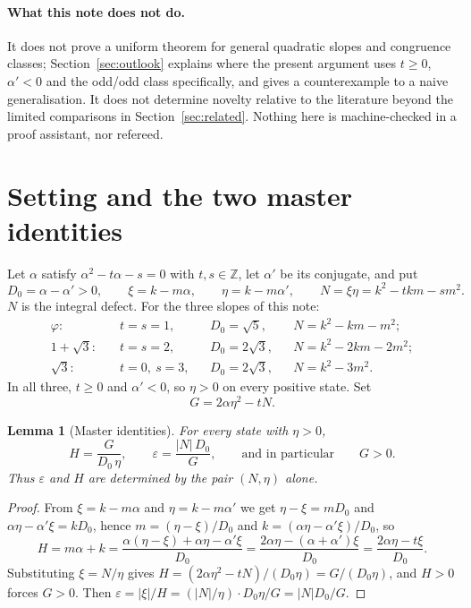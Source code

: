 \documentclass[11pt]{article}
\newtheorem{lemma}[theorem]{Lemma}
\theoremstyle{definition}
\theoremstyle{remark}
\newcommand{\Z}{\mathbb{Z}}
\begin{document}
\paragraph{What this note does not do.}
It does not prove a uniform theorem for general quadratic slopes and congruence classes;
Section~\ref{sec:outlook} explains where the present argument uses $t\ge0$, $\alpha'<0$ and the
odd/odd class specifically, and gives a counterexample to a naive generalisation. It does not
determine novelty relative to the literature beyond the limited comparisons in
Section~\ref{sec:related}. Nothing here is machine-checked in a proof assistant, nor refereed.

\section{Setting and the two master identities}\label{sec:master}

Let $\alpha$ satisfy $\alpha^2-t\alpha-s=0$ with $t,s\in\Z$, let $\alpha'$ be its conjugate,
and put
\[
D_0=\alpha-\alpha'>0,\qquad
\xi=k-m\alpha,\qquad \eta=k-m\alpha',\qquad
N=\xi\eta=k^2-tkm-sm^2 .
\]
$N$ is the integral defect. For the three slopes of this note:
\[
\begin{aligned}
\varphi:\quad &t=s=1, &&D_0=\sqrt5, &&N=k^2-km-m^2;\\
1+\sqrt3:\quad &t=s=2, &&D_0=2\sqrt3, &&N=k^2-2km-2m^2;\\
\sqrt3:\quad &t=0,\ s=3, &&D_0=2\sqrt3, &&N=k^2-3m^2 .
\end{aligned}
\]
In all three, $t\ge0$ and $\alpha'<0$, so $\eta>0$ on every positive state. Set
\begin{equation}\label{eq:G}
G=2\alpha\eta^2-tN .
\end{equation}

\begin{lemma}[Master identities]\label{lem:master}
For every state with $\eta>0$,
\begin{equation}\label{eq:masters}
H=\frac{G}{D_0\,\eta},\qquad
\varepsilon=\frac{|N|\,D_0}{G},\qquad\text{and in particular}\qquad
G>0 .
\end{equation}
Thus $\varepsilon$ and $H$ are determined by the pair $(N,\eta)$ alone.
\end{lemma}

\begin{proof}
From $\xi=k-m\alpha$ and $\eta=k-m\alpha'$ we get $\eta-\xi=mD_0$ and
$\alpha\eta-\alpha'\xi=kD_0$, hence $m=(\eta-\xi)/D_0$ and $k=(\alpha\eta-\alpha'\xi)/D_0$, so
\[
H=m\alpha+k=\frac{\alpha(\eta-\xi)+\alpha\eta-\alpha'\xi}{D_0}
=\frac{2\alpha\eta-(\alpha+\alpha')\xi}{D_0}=\frac{2\alpha\eta-t\xi}{D_0}.
\]
Substituting $\xi=N/\eta$ gives $H=(2\alpha\eta^2-tN)/(D_0\eta)=G/(D_0\eta)$, and $H>0$ forces
$G>0$. Then $\varepsilon=|\xi|/H=(|N|/\eta)\cdot D_0\eta/G=|N|D_0/G$.
\end{proof}
\end{document}
